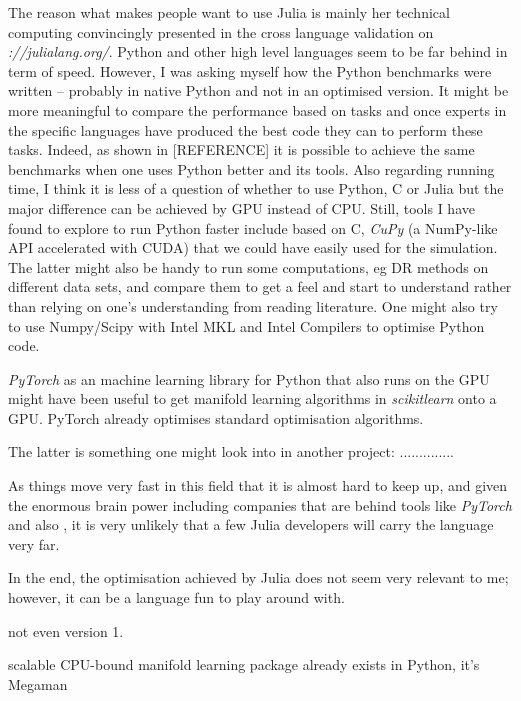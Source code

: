 \documentclass[journal, a4paper]{IEEEtran}
\begin{document}
The reason what makes people want to use Julia is mainly her technical computing convincingly presented in the cross language validation on \textit{\http://julialang.org/}. Python and other high level languages seem to be far behind in term of speed. However, I was asking myself how the Python benchmarks were written -- probably in native Python and not in an optimised version. It might be more meaningful to compare the performance based on tasks and once experts in the specific languages have produced the best code they can to perform these tasks. Indeed, as shown in [REFERENCE] it is possible to achieve the same benchmarks when one uses Python better and its tools. Also regarding running time, I think it is less of a question of whether to use Python, C or Julia but the major difference can be achieved by GPU instead of CPU.
Still, tools I have found to explore to run Python faster include  based on C, \textit{CuPy} (a NumPy-like API accelerated with CUDA) that we could have easily used for the simulation. The latter might also be handy to run some computations, eg DR methods on different data sets, and compare them to get a feel and start to understand rather than relying on one's understanding from reading literature. One might also try to use Numpy/Scipy with Intel MKL and Intel Compilers to optimise Python code.

\textit{PyTorch} as an machine learning library for Python that also runs on the GPU might have been useful to get manifold learning algorithms in \textit{scikitlearn} onto a GPU. PyTorch already optimises standard optimisation algorithms.  

The latter is something one might look into in another project: ..............

As things move very fast in this field that it is almost hard to keep up, and given the enormous brain power including companies that are behind tools like \textit{PyTorch} and also , it is very unlikely that a few Julia developers will carry the language very far. 

In the end, the optimisation achieved by Julia does not seem very relevant to me; however, it can be a language fun to play around with.





not even version 1. 


scalable CPU-bound manifold learning package already exists in Python, it’s Megaman 
\end{document}
